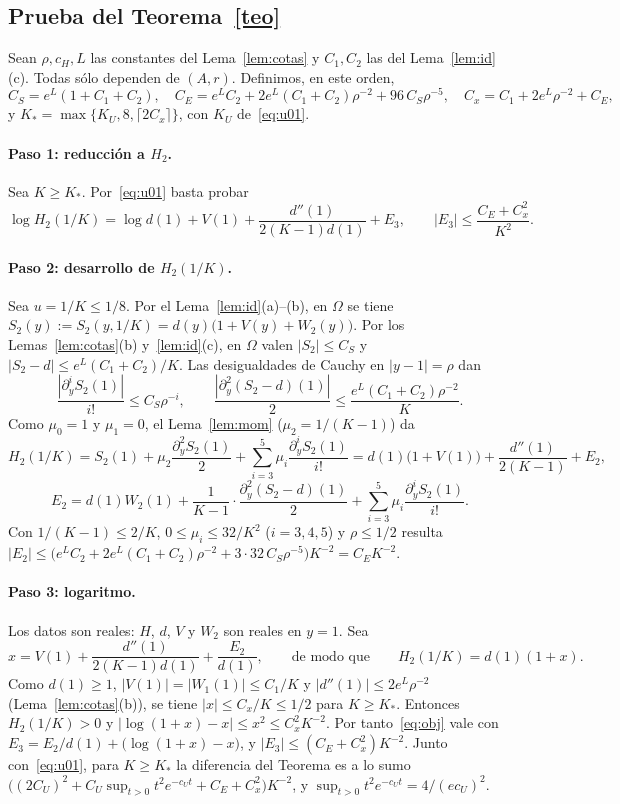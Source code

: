 \subsection*{Prueba del Teorema~\ref{teo}}
Sean $\rho,c_H,L$ las constantes del Lema~\ref{lem:cotas} y $C_1,C_2$ las del
Lema~\ref{lem:id}(c). Todas sólo dependen de $(A,r)$. Definimos, en este orden,
\[
 C_S=e^L(1+C_1+C_2),\quad C_E=e^LC_2+2e^L(C_1+C_2)\rho^{-2}+96\,C_S\rho^{-5},\quad
 C_x=C_1+2e^L\rho^{-2}+C_E,
\]
y $K_*=\max\{K_U,8,\lceil2C_x\rceil\}$, con $K_U$ de~\eqref{eq:u01}.

\paragraph{Paso 1: reducción a $H_2$.} Sea $K\ge K_*$. Por~\eqref{eq:u01} basta probar
\begin{equation}\label{eq:obj}
 \log H_2(1/K)=\log d(1)+V(1)+\frac{d''(1)}{2(K-1)d(1)}+E_3,\qquad
 |E_3|\le\frac{C_E+C_x^2}{K^2}.
\end{equation}

\paragraph{Paso 2: desarrollo de $H_2(1/K)$.} Sea $u=1/K\le1/8$. Por el Lema~\ref{lem:id}(a)--(b),
en $\Omega$ se tiene $S_2(y):=S_2(y,1/K)=d(y)\bigl(1+V(y)+W_2(y)\bigr)$. Por los
Lemas~\ref{lem:cotas}(b) y~\ref{lem:id}(c), en $\Omega$ valen $|S_2|\le C_S$ y
$|S_2-d|\le e^L(C_1+C_2)/K$. Las desigualdades de Cauchy en $|y-1|=\rho$ dan
\[
 \frac{|\partial_y^iS_2(1)|}{i!}\le C_S\rho^{-i},\qquad
 \frac{|\partial_y^2(S_2-d)(1)|}{2}\le\frac{e^L(C_1+C_2)\rho^{-2}}K .
\]
Como $\mu_0=1$ y $\mu_1=0$, el Lema~\ref{lem:mom} ($\mu_2=1/(K-1)$) da
\[
 H_2(1/K)=S_2(1)+\mu_2\frac{\partial_y^2S_2(1)}2+\sum_{i=3}^5\mu_i\frac{\partial_y^iS_2(1)}{i!}
 =d(1)\bigl(1+V(1)\bigr)+\frac{d''(1)}{2(K-1)}+E_2,
\]
\[
 E_2=d(1)W_2(1)+\frac1{K-1}\cdot\frac{\partial_y^2(S_2-d)(1)}2
 +\sum_{i=3}^5\mu_i\frac{\partial_y^iS_2(1)}{i!}.
\]
Con $1/(K-1)\le2/K$, $0\le\mu_i\le32/K^2$ ($i=3,4,5$) y $\rho\le1/2$ resulta
$|E_2|\le\bigl(e^LC_2+2e^L(C_1+C_2)\rho^{-2}+3\cdot32\,C_S\rho^{-5}\bigr)K^{-2}=C_EK^{-2}$.

\paragraph{Paso 3: logaritmo.} Los datos son reales: $H$, $d$, $V$ y $W_2$ son reales en $y=1$. Sea
\[
 x=V(1)+\frac{d''(1)}{2(K-1)d(1)}+\frac{E_2}{d(1)},\qquad\text{de modo que}\qquad H_2(1/K)=d(1)(1+x).
\]
Como $d(1)\ge1$, $|V(1)|=|W_1(1)|\le C_1/K$ y $|d''(1)|\le2e^L\rho^{-2}$ (Lema~\ref{lem:cotas}(b)),
se tiene $|x|\le C_x/K\le1/2$ para $K\ge K_*$. Entonces $H_2(1/K)>0$ y
$|\log(1+x)-x|\le x^2\le C_x^2K^{-2}$. Por tanto~\eqref{eq:obj} vale con
$E_3=E_2/d(1)+\bigl(\log(1+x)-x\bigr)$, y $|E_3|\le(C_E+C_x^2)K^{-2}$.
Junto con~\eqref{eq:u01}, para $K\ge K_*$ la diferencia del Teorema es a lo sumo
$\bigl((2C_U)^2+C_U\sup_{t>0}t^2e^{-c_Ut}+C_E+C_x^2\bigr)K^{-2}$, y
$\sup_{t>0}t^2e^{-c_Ut}=4/(ec_U)^2$.

